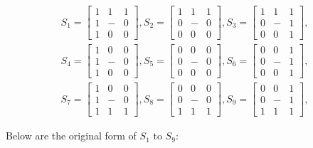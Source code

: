 \documentclass[paper=a4, fontsize=11pt]{scrartcl} %
\numberwithin{equation}{section} %
\numberwithin{figure}{section} %
\numberwithin{table}{section} %
\begin{document}
\begin{align*}
S_1 = 
\begin{bmatrix}
    1 & 1 & 1\\
    1 & - & 0\\
    1 & 0 & 0
\end{bmatrix},
S_2 = 
\begin{bmatrix}
    1 & 1 & 1\\
    0 & - & 0\\
    0 & 0 & 0
\end{bmatrix},
S_3 = 
\begin{bmatrix}
    1 & 1 & 1\\
    0 & - & 1\\
    0 & 0 & 1
\end{bmatrix},\\
S_4 = 
\begin{bmatrix}
    1 & 0 & 0\\
    1 & - & 0\\
    1 & 0 & 0
\end{bmatrix},
S_5 = 
\begin{bmatrix}
    0 & 0 & 0\\
    0 & - & 0\\
    0 & 0 & 0
\end{bmatrix},
S_6 = 
\begin{bmatrix}
    0 & 0 & 1\\
    0 & - & 1\\
    0 & 0 & 1
\end{bmatrix},\\
S_7 = 
\begin{bmatrix}
    1 & 0 & 0\\
    1 & - & 0\\
    1 & 1 & 1
\end{bmatrix},
S_8 = 
\begin{bmatrix}
    0 & 0 & 0\\
    0 & - & 0\\
    1 & 1 & 1
\end{bmatrix},
S_9 = 
\begin{bmatrix}
    0 & 0 & 1\\
    0 & - & 1\\
    1 & 1 & 1
\end{bmatrix},
\end{align*}

Below are the original form of $S_1$ to $S_9$:
\end{document}
